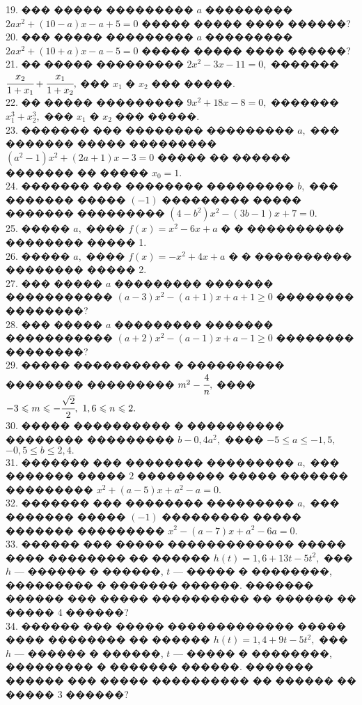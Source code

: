 \documentclass[12pt]{article}
\begin{document}
19. ��� ����� ��������� $a$ ��������� $2ax^2+(10-a)x-a+5=0$ ����� ����� ���� ������?\\
20. ��� ����� ��������� $a$ ��������� $2ax^2+(10+a)x-a-5=0$ ����� ����� ���� ������?\\
21. �� ����� ��������� $2x^2-3x-11=0,$ ������� $\cfrac{x_2}{1+x_1}+\cfrac{x_1}{1+x_2},$ ��� $x_1$ � $x_2$ ��� �����.\\
22. �� ����� ��������� $9x^2+18x-8=0,$ ������� $x_1^3+x_2^3,$ ��� $x_1$ � $x_2$ ��� �����.\\
23. ������� ��� �������� ��������� $a,$ ��� ������� ����� ��������� $(a^2-1)x^2+(2a+1)x-3=0$ ����� �� ������ ������� �� ����� $x_0=1.$\\
24. ������� ��� �������� ��������� $b,$ ��� ������� ����� $(-1)$ ��������� ����� ������� ��������� $(4-b^2)x^2-(3b-1)x+7=0.$\\
25. ����� $a,$ ���� $f(x)=x^2-6x+a$ � � ���������� �������� ����� 1.\\
26. ����� $a,$ ���� $f(x)=-x^2+4x+a$ � � ���������� �������� ����� 2.\\
27. ��� ����� $a$ ��������� ������� ����������� $(a-3)x^2-(a+1)x+a+1\geqslant0$ �������� ��������?\\
28. ��� ����� $a$ ��������� ������� ����������� $(a+2)x^2-(a-1)x+a-1\geqslant0$ �������� ��������?\\
29. ����� ���������� � ���������� �������� ��������� $m^2-\cfrac{4}{n},$ ���� $-3\leqslant m\leqslant-\cfrac{\sqrt{2}}{2},\ 1,6\leqslant n\leqslant 2.$\\
30. ����� ���������� � ���������� �������� ��������� $b-0,4a^2,$ ���� $-5\leqslant a\leqslant-1,5,$\\$-0,5\leqslant b\leqslant2,4.$\\
31. ������� ��� �������� ��������� $a,$ ��� ������� ����� $2$ ��������� ����� ������� ��������� $x^2+(a-5)x+a^2-a=0.$\\
32. ������� ��� �������� ��������� $a,$ ��� ������� ����� $(-1)$ ��������� ����� ������� ��������� $x^2-(a-7)x+a^2-6a=0.$\\
33. ������ ��� ����� ������������� ����� ���� �������� �� ������ $h(t)=1,6+13t-5t^2,$ ��� $h$ --- ������ � ������, $t$ --- ����� � ��������, ��������� � ������� ������. ������� ������ ��� ����� ���������� �� ������ �� ����� 4 ������?\\
34. ������ ��� ����� ������������� ����� ���� �������� �� ������ $h(t)=1,4+9t-5t^2,$ ��� $h$ --- ������ � ������, $t$ --- ����� � ��������, ��������� � ������� ������. ������� ������ ��� ����� ���������� �� ������ �� ����� 3 ������?\\
\end{document}
